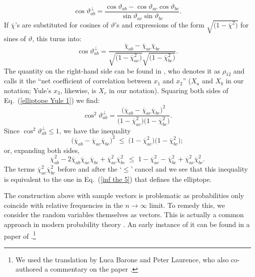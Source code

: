 \begin{equation}
\cos{\vartheta_{ab}^\perp} = \frac{\cos{\vartheta_{ab}} - \cos{\vartheta_{ac}} \cos{\vartheta_{bc}}}{\sin{\vartheta_{ac}} \sin{\vartheta_{bc}}}. 
\label{cos theta ab perp}
\end{equation}
If $\overline{\chi}$'s are substituted for cosines of $\vartheta$'s and expressions of the form $\sqrt{\big( 1 - \overline{\chi}^2 \big)}$ for sines of $\vartheta$, this turns into:
\begin{equation}
\cos{\vartheta_{ab}^\perp} = \frac{\overline{\chi}_{ab} - \overline{\chi}_{ac} \overline{\chi}_{bc}}{\sqrt{\big( 1 - \overline{\chi}_{ac}^2 \big)} \sqrt{\big( 1 - \overline{\chi}_{bc}^2 \big)}}. 
\label{elliptope Yule 1}
\end{equation}
The quantity on the right-hand side can be found in \citet[p.\ 485]{Yule 1896}, who denotes it as $\rho_{12}$ and calls it the ``net coefficient of correlation between $x_1$ and $x_2$'' ($X_a$ and $X_b$ in our notation; Yule's $x_3$, likewise, is $X_c$ in our notation). Squaring both sides of Eq.\ (\ref{elliptope Yule 1}) we find:
\begin{equation}
\cos^2{\! \vartheta_{ab}^\perp} = \frac{ \big( \overline{\chi}_{ab} - \overline{\chi}_{ac} \overline{\chi}_{bc} \big)^2}{\big(1 - \overline{\chi}_{ac}^2 \big) \big( 1 - \overline{\chi}_{bc}^2 \big)}.
\label{elliptope Yule 2}
\end{equation}
Since $\cos^2{\! \vartheta_{ab}^\perp} \le 1$, we have the inequality \citep[p.\ 486]{Yule 1896}
\begin{equation}
  \big(\overline{\chi}_{ab} - \overline{\chi}_{ac} \overline{\chi}_{bc} \big)^2 \; \le \; \big( 1 - \overline{\chi}_{ac}^2 \big) \big( 1 - \overline{\chi}_{bc}^2 \big);
  \label{lastminute}
\end{equation}
or, expanding both sides,  
\begin{equation}
\overline{\chi}_{ab}^2 - 2 \overline{\chi}_{ab} \overline{\chi}_{ac} \overline{\chi}_{bc} + \overline{\chi}_{ac}^2 \overline{\chi}_{bc}^2
\; \le \; 1 - \overline{\chi}_{ac}^2 - \overline{\chi}_{bc}^2 + \overline{\chi}_{ac}^2 \overline{\chi}_{bc}^2.
\label{elliptope deja vu}
\end{equation}
The terms $\overline{\chi}_{ac}^2 \overline{\chi}_{bc}^2$ before and after the `$\le$' cancel and we see that this inequality is equivalent to the one in Eq.\ (\ref{inf the 5}) that defines the elliptope.

The construction above with sample vectors is problematic as probabilities only coincide with relative frequencies in the $n\to\infty$ limit. 
To remedy this, we consider the random variables themselves as vectors. This is actually a common approach in modern probability theory \citep[see, e.g.,][]{Fristedt and Gray 1997}. An early instance of it can be found in a paper of \citet{De Finetti 1937}.\footnote{We used the translation by Luca Barone and Peter Laurence, who also co-authored a commentary on the paper \citep{Laurence 2008}.}

